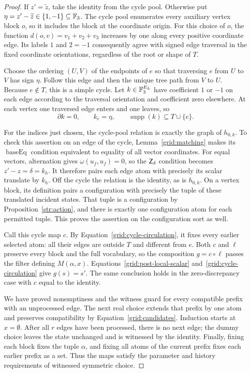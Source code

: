 \begin{proof}
If $z'=\widetilde z$, take the identity from the cycle pool.  Otherwise
put $\eta=z'-\widetilde z\in\{1,-1\}\subseteq\mathbb F_3$.  The cycle pool
enumerates every auxiliary vertex block $o$, so it includes the block
at the coordinate origin.  For this choice of $o$, the function
$d(o,v)=v_1+v_2+v_3$ increases by one along every positive coordinate
edge.  Its labels $1$ and $2=-1$ consequently agree with signed edge
traversal in the fixed coordinate orientations, regardless of the root
or shape of $T$.

Choose the ordering $(U,V)$ of the endpoints of $e$ so that traversing
$e$ from $U$ to $V$ has sign $\eta$.  Follow this edge and then the
unique tree path from $V$ to $U$.  Because $e\notin T$, this is a simple
cycle.  Let $k\in\mathbb F_3^{E_L}$ have coefficient $1$ or $-1$ on each edge
according to the traversal orientation and coefficient zero elsewhere.
At each vertex one traversed edge enters and one leaves, so
\begin{equation}\label{grid:cycle-circulation}
 \partial k=0,\qquad k_e=\eta,\qquad
 \operatorname{supp}(k)\subseteq T\cup\{e\}.
\end{equation}

For the indices just chosen, the cycle-pool relation is exactly the
graph of $h_{0,k}$.  To check this assertion on an edge of the cycle,
Lemma~\ref{grid:matching} makes its $\operatorname{baseEq}$ condition
equivalent to equality of all vector coordinates.  For equal vectors,
alternation gives $\omega(u_f,u_f)=0$, so the
$\mathsf Z_{\delta}$ condition becomes $z'-z=\delta=k_h$.  It therefore
pairs each edge atom with precisely its scalar translate by $k_h$.
Off the cycle the relation is the identity, as is $h_{0,k}$.  On a
vertex block, its definition pairs a configuration with precisely the
tuple of these translated incident states.  That tuple is a
configuration by Proposition~\ref{str:action}, and there is exactly
one configuration atom for each permitted tuple.  This proves the
assertion on the configuration sort as well.

Call this cycle map $c$.  By Equation~\eqref{grid:cycle-circulation},
it fixes every earlier selected atom: all their edges are outside $T$
and different from $e$.  Both $c$ and $\ell$ preserve every block and
the full vocabulary, so the composition $g=c\circ\ell$ passes the
filter defining $M(\alpha,x)$.  Equations~\eqref{grid:post-local-scalar}
and~\eqref{grid:cycle-circulation} give $g(s)=s'$.  The same conclusion
holds in the zero-discrepancy case with $c$ equal to the identity.

We have proved nonemptiness and the witness guard for every compatible
prefix with an unprocessed edge.  The next real choice extends that
prefix by one atom and preserves compatibility by
Equation~\eqref{grid:candidates}.  Induction starts at $x=\emptyset$.
After all $r$ edges have been processed, there is no next edge; the
dummy choice leaves the state unchanged and is witnessed by the
identity.  Finally, fixing each block fixes the tuple $\alpha$, and
fixing all atoms of the current prefix fixes each earlier prefix as
a set.  Thus the maps satisfy the parameter and history requirements
of witnessed symmetric choice.
\end{proof}

